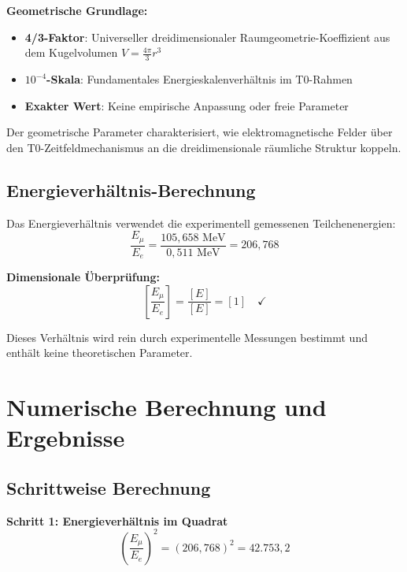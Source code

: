 \documentclass[12pt,a4paper]{report}
\begin{document}
	\textbf{Geometrische Grundlage:}
	\begin{itemize}
		\item \textbf{4/3-Faktor}: Universeller dreidimensionaler Raumgeometrie-Koeffizient aus dem Kugelvolumen $V = \frac{4\pi}{3}r^3$
		\item \textbf{$10^{-4}$-Skala}: Fundamentales Energieskalenverhältnis im T0-Rahmen
		\item \textbf{Exakter Wert}: Keine empirische Anpassung oder freie Parameter
	\end{itemize}
	
	Der geometrische Parameter charakterisiert, wie elektromagnetische Felder über den T0-Zeitfeldmechanismus an die dreidimensionale räumliche Struktur koppeln.
	
	\subsection{Energieverhältnis-Berechnung}
	\label{subsec:energy_ratio_calculation}
	
	Das Energieverhältnis verwendet die experimentell gemessenen Teilchenenergien:
	\begin{equation}
		\frac{E_\mu}{E_e} = \frac{105,658 \text{ MeV}}{0,511 \text{ MeV}} = 206,768
	\end{equation}
	
	\textbf{Dimensionale Überprüfung:}
	\begin{equation}
		\left[\frac{E_\mu}{E_e}\right] = \frac{[E]}{[E]} = [1] \quad \checkmark
	\end{equation}
	
	Dieses Verhältnis wird rein durch experimentelle Messungen bestimmt und enthält keine theoretischen Parameter.
	
	\section{Numerische Berechnung und Ergebnisse}
	\label{sec:numerical_calculation}
	
	\subsection{Schrittweise Berechnung}
	\label{subsec:step_by_step_calculation}
	
	\textbf{Schritt 1: Energieverhältnis im Quadrat}
	\begin{equation}
		\left(\frac{E_\mu}{E_e}\right)^2 = (206,768)^2 = 42.753,2
	\end{equation}
	
\end{document}
